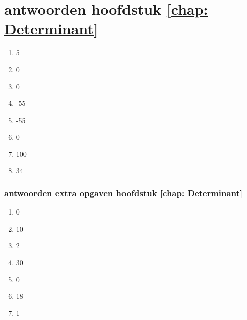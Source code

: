 \section{antwoorden  hoofdstuk \ref{chap: Determinant}}
\begin{enumerate}[label=\Alph*]
	\item 5
	\item 0
	\item 0
	\item -55
	\item -55
	\item 0
	\item 100
	\item 34
\end{enumerate}
\subsubsection{antwoorden extra opgaven hoofdstuk \ref{chap: Determinant}}
\begin{enumerate}[label=\Alph*]
	\item 0
	\item 10
	\item 2
	\item 30
	\item 0
	\item 18
	\item 1
\end{enumerate}
